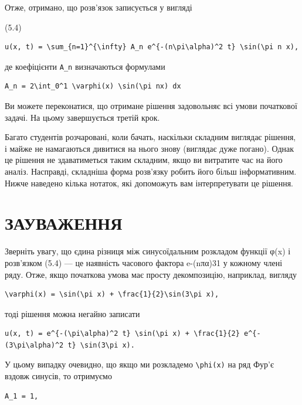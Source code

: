 \documentclass[
  ukrainian,
]{article}
\begin{document}
Отже, отримано, що розв'язок записується у вигляді

(5.4)

\begin{verbatim}
u(x, t) = \sum_{n=1}^{\infty} A_n e^{-(n\pi\alpha)^2 t} \sin(\pi n x),
\end{verbatim}

де коефіцієнти \texttt{A\_n} визначаються формулами

\begin{verbatim}
A_n = 2\int_0^1 \varphi(x) \sin(\pi nx) dx
\end{verbatim}

Ви можете переконатися, що отримане рішення задовольняє всі умови
початкової задачі. На цьому завершується третій крок.

Багато студентів розчаровані, коли бачать, наскільки складним виглядає
рішення, і майже не намагаються дивитися на нього знову (виглядає дуже
погано). Однак це рішення не здаватиметься таким складним, якщо ви
витратите час на його аналіз. Насправді, складніша форма розв'язку
робить його більш інформативним. Нижче наведено кілька нотаток, які
допоможуть вам інтерпретувати це рішення.

\section{ЗАУВАЖЕННЯ}\label{ux437ux430ux443ux432ux430ux436ux435ux43dux43dux44f-2}

Зверніть увагу, що єдина різниця між синусоїдальним розкладом функції
φ(x) і розв'язком (5.4) --- це наявність часового фактора e-(nπα)31 у
кожному члені ряду. Отже, якщо початкова умова має просту декомпозицію,
наприклад, вигляду

\begin{verbatim}
\varphi(x) = \sin(\pi x) + \frac{1}{2}\sin(3\pi x),
\end{verbatim}

тоді рішення можна негайно записати

\begin{verbatim}
u(x, t) = e^{-(\pi\alpha)^2 t} \sin(\pi x) + \frac{1}{2} e^{-(3\pi\alpha)^2 t} \sin(3\pi x).
\end{verbatim}

У цьому випадку очевидно, що якщо ми розкладемо
\texttt{\textbackslash{}phi(x)} на ряд Фур'є вздовж синусів, то
отримуємо

\begin{verbatim}
A_1 = 1,
\end{verbatim}
\end{document}
